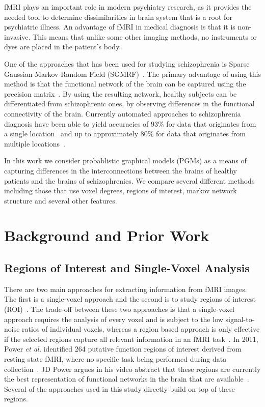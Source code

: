 \documentclass{article} %
\begin{document}
fMRI plays an important role in modern psychiatry research, as it provides the needed tool to determine dissimilarities in brain system that is a root for psychiatric illness\cite{Zhan_2015}. An advantage of fMRI in
medical diagnosis is that it is non-invasive. This means that unlike some 
other imaging methods, no instruments or dyes are placed in the patient’s body.\cite{fmriMatthews}\cite{Grinvald_2000}. 

One of the approaches that has been used for studying schizophrenia is 
Sparse Gaussian Markov Random Field (SGMRF)~\cite{Rish_2013}\cite{Rosa_2013}. 
The primary advantage of using this method is that the functional network of 
the brain can be captured using the precision matrix~\cite{Rish_2013}.
By using the resulting network, healthy subjects can be differentiated from 
schizophrenic ones, by observing differences in the functional connectivity 
of the brain. Currently automated approaches to schizophrenia
diagnosis have been able to yield accuracies of $93\%$ for data that 
originates from a single location~\cite{Rish_2013} and up to approximately 
$80\%$ for data that originates from multiple locations~\cite{Cheng2015}.

In this work we consider probablistic graphical models (PGMs) as a means
of capturing differences in the interconnections between the brains of
healthy patients and the brains of schizophrenics. We compare several 
different methods including those that use voxel degrees, regions of 
interest, markov network structure and several other features. 

\section{Background and Prior Work}

\subsection{Regions of Interest and Single-Voxel Analysis}
There are two main approaches for extracting
information from fMRI images. The first is a single-voxel approach and 
the second is to study regions of interest (ROI)~\cite{heller2006cluster}. 
The trade-off between these two approaches is that a single-voxel approach
requires the analysis of every voxel and is subject to the low signal-to-noise 
ratios of individual voxels, whereas a region based approach is only
effective if the selected regions capture all relevant information in an fMRI 
task~\cite{heller2006cluster}. In 2011, Power \emph{et al.} identified 264 
putative function regions of interest derived from resting state fMRI, where 
no specific task being performed during data collection~\cite{Power_2011}. 
JD Power argues in his video abstract that these regions are currently the
best representation of functional networks in the brain that are
available~\cite{Power_2011}. Several of the approaches used in this study
directly build on top of these regions.
\end{document}
